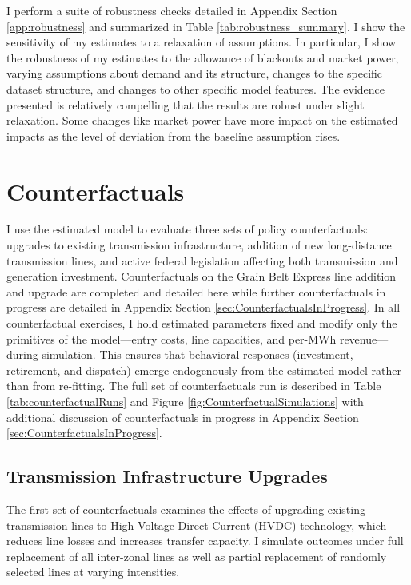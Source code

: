 \documentclass[12pt]{article}
\begin{document}
I perform a suite of robustness checks detailed in Appendix Section \ref{app:robustness} and summarized in Table \ref{tab:robustness_summary}. I show the sensitivity of my estimates to a relaxation of assumptions. In particular, I show the robustness of my estimates to the allowance of blackouts and market power, varying assumptions about demand and its structure, changes to the specific dataset structure, and changes to other specific model features. The evidence presented is relatively compelling that the results are robust under slight relaxation. Some changes like market power have more impact on the estimated impacts as the level of deviation from the baseline assumption rises.

\section{Counterfactuals} \label{sec:Counterfactuals}

I use the estimated model to evaluate three sets of policy counterfactuals: upgrades to existing transmission infrastructure, addition of new long-distance transmission lines, and active federal legislation affecting both transmission and generation investment. Counterfactuals on the Grain Belt Express line addition and upgrade are completed and detailed here while further counterfactuals in progress are detailed in Appendix Section \ref{sec:CounterfactualsInProgress}. In all counterfactual exercises, I hold estimated parameters fixed and modify only the primitives of the model---entry costs, line capacities, and per-MWh revenue---during simulation. This ensures that behavioral responses (investment, retirement, and dispatch) emerge endogenously from the estimated model rather than from re-fitting. The full set of counterfactuals run is described in Table \ref{tab:counterfactualRuns} and Figure \ref{fig:CounterfactualSimulations} with additional discussion of counterfactuals in progress in Appendix Section \ref{sec:CounterfactualsInProgress}.

\subsection{Transmission Infrastructure Upgrades}

The first set of counterfactuals examines the effects of upgrading existing transmission lines to High-Voltage Direct Current (HVDC) technology, which reduces line losses and increases transfer capacity. I simulate outcomes under full replacement of all inter-zonal lines as well as partial replacement of randomly selected lines at varying intensities.
\end{document}

